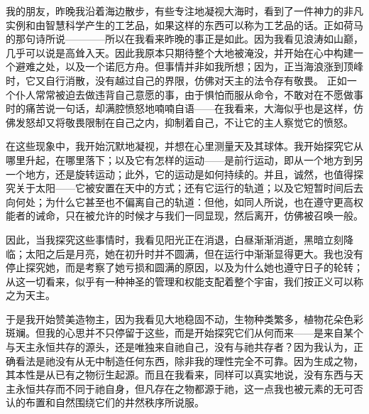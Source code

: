  我的朋友，昨晚我沿着海边散步，有些专注地凝视大海时，看到了一件神力的非凡实例和由智慧科学产生的工艺品，如果这样的东西可以称为工艺品的话。正如荷马的那句诗所说————所以在我看来昨晚的事正是如此。因为我看见浪涛如山巅，几乎可以说是高耸入天。因此我原本只期待整个大地被淹没，并开始在心中构建一个避难之处，以及一个诺厄方舟。但事情并非如我所想；因为，正当海浪涨到顶峰时，它又自行消散，没有越过自己的界限，仿佛对天主的法令存有敬畏。 正如一个仆人常常被迫去做违背自己意愿的事，由于惧怕而服从命令，不敢对在不愿做事时的痛苦说一句话，却满腔愤怒地喃喃自语——在我看来，大海似乎也是这样，仿佛发怒却又将敬畏限制在自己之内，抑制着自己，不让它的主人察觉它的愤怒。\par

在这些现象中，我开始沉默地凝视，并想在心里测量天及其球体。我开始探究它从哪里升起，在哪里落下；以及它有怎样的运动——是前行运动，即从一个地方到另一个地方，还是旋转运动；此外，它的运动是如何持续的。并且，诚然，也值得探究关于太阳——它被安置在天中的方式；还有它运行的轨道；以及它短暂时间后去向何处；为什么它甚至也不偏离自己的轨道：但他，如同人所说，也在遵守更高权能者的诫命，只在被允许的时候才与我们一同显现，然后离开，仿佛被召唤一般。\par

因此，当我探究这些事情时，我看见阳光正在消退，白昼渐渐消逝，黑暗立刻降临；太阳之后是月亮，她在初升时并不圆满，但在运行中渐渐显得更大。我也没有停止探究她，而是考察了她亏损和圆满的原因，以及为什么她也遵守日子的轮转；从这一切看来，似乎有一种神圣的管理和权能支配着整个宇宙，我们按正义可以称之为天主。\par

于是我开始赞美造物主，因为我看见大地稳固不动，生物种类繁多，植物花朵色彩斑斓。但我的心思并不只停留于这些，而是开始探究它们从何而来——是来自某个与天主永恒共存的源头，还是唯独来自祂自己，没有与祂共存者？因为我认为，正确看法是祂没有从无中制造任何东西，除非我的理性完全不可靠。因为生成之物，其本性是从已有之物衍生起源。而且在我看来，同样可以真实地说，没有东西与天主永恒共存而不同于祂自身，但凡存在之物都源于祂，这一点我也被元素的无可否认的布置和自然围绕它们的井然秩序所说服。\par


